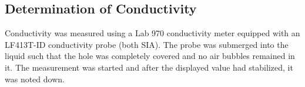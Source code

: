 \subsection{Determination of Conductivity}
Conductivity was measured using a Lab 970 conductivity meter equipped with an LF413T-ID conductivity probe (both SIA). The probe was submerged into the liquid such that the hole was completely covered and no air bubbles remained in it. The measurement was started and after the displayed value had stabilized, it was noted down.

